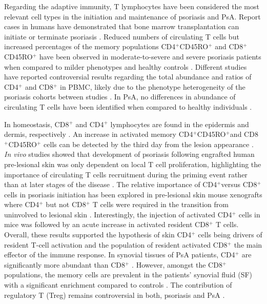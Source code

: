 Regarding the adaptive immunity, T lymphocytes have been considered the most relevant cell types in the initiation and maintenance of psoriasis and PsA. Report cases in humans have demonstrated that bone marrow transplantation can initiate or terminate psoriasis \parencite{Eedy1990, Gardembas1990}. Reduced numbers of circulating T cells but increased percentages of the memory populations CD4$^+$CD45RO$^+$ and CD8$^+$CD45RO$^+$ have been observed in moderate-to-severe and severe psoriasis patients when compared to milder phenotypes and healthy controls \parencite{Lecewicz-Toruń2001,Langewouters2008}. Different studies have reported controversial results regarding the total abundance and ratios of CD4$^+$ and CD8$^{+}$ in PBMC, likely due to the phenotype heterogeneity of the psoriasis cohorts between studies \parencite{Lecewicz-Toruń2001,Cameron2003,Langewouters2008}. In PsA, no differences in abundance of circulating T cells have been identified when compared to healthy individuals \parencite{Costello1999}.

In homeostasis, CD8$^+$ and CD4$^+$ lymphocytes are found in the epidermis and dermis, respectively \parencite{Clark2006}. An increase in activated memory CD4$^{+}$CD45RO$^{+}$and CD8$^{+}$CD45RO$^{+}$ cells can be detected by the third day from the lesion appearance \parencite{Clark2006,Perera2012 }. \textit{In vivo} studies showed that development of psoriasis following engrafted human pre-lesional skin was only dependent on local T cell proliferation, highlighting the importance of circulating T cells recruitment during the priming event rather than at later stages of the disease \parencite{ Boyle2013,Perera2012}. The relative importance of CD4$^+$versus CD8$^+$ cells in psoriasis initiation has been explored in pre-lesional skin mouse xenografts where CD4$^+$ but not CD8$^+$ T cells were required in the transition from uninvolved to lesional skin \parencite{Nickoloff1999}. Interestingly, the injection of activated CD4$^+$ cells in mice was followed by an acute increase in activated resident CD8$^+$ T cells. Overall, these results supported the hypothesis of skin CD4$^+$ cells being drivers of resident T-cell activation and the population of resident activated CD8$^+$ the main effector of the immune response. In synovial tissues of PsA patients, CD4$^+$ are significantly more abundant than CD8$^+$ \parencite{Diani2015}. However, amongst the CD8$^+$ populations, the memory cells are prevalent in the patients’ synovial fluid (SF) with a significant enrichment compared to controls \parencite{Costello1999}. The contribution of regulatory T (Treg) remains controversial in both, psoriasis and PsA \parencite{Perera2012}. 

